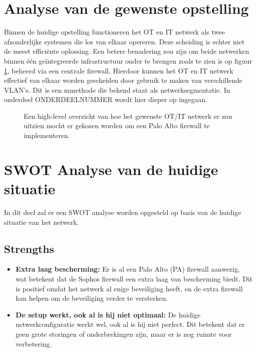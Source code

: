 \section{Analyse van de gewenste opstelling}
Binnen de huidige opstelling functioneren het OT en IT netwerk als twee afzonderlijke systemen die los van elkaar opereren. Deze scheiding is echter niet de meest efficiënte oplossing. Een betere benadering zou zijn om beide netwerken binnen één geïntegreerde infrastructuur onder te brengen zoals te zien is op figuur \ref{fig:FR16_after.png}, beheerd via een centrale firewall. Hierdoor kunnen het OT en IT netwerk effectief van elkaar worden gescheiden door gebruik te maken van verschillende VLAN’s. Dit is een mmethode die bekend staat als netwerksegmentatie. In onderdeel ONDERDEELNUMMER wordt hier dieper op ingegaan.

\begin{figure}[H]
    \centering
    \caption[high-level overzicht]{\label{fig:FR16_after.png}Een high-level overzicht van hoe het gewenste OT/IT netwerk er zou uitzien mocht er gekozen worden om een Palo Alto firewall te implementeren.}
\end{figure}


\section{SWOT Analyse van de huidige situatie}
In dit deel zal er een SWOT analyse worden opgesteld op basis van de huidige situatie van het netwerk.


\subsection{Strengths}
\begin{itemize}
\item \textbf{Extra laag bescherming:} Er is al een Palo Alto (PA) firewall aanwezig, wat betekent dat de Sophos firewall een extra laag van bescherming biedt. Dit is positief omdat het netwerk al enige beveiliging heeft, en de extra firewall kan helpen om de beveiliging verder te versterken.

\item \textbf{De setup werkt, ook al is hij niet optimaal:} De huidige netwerkconfiguratie werkt wel, ook al is hij niet perfect. Dit betekent dat er geen grote storingen of onderbrekingen zijn, maar er is nog ruimte voor verbetering.
\end{itemize}

